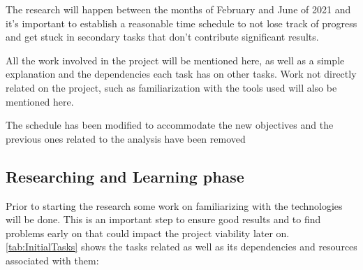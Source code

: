 \label{sec:Tasks}
The research will happen between the months of February and June of 2021 and it's important to establish a reasonable time schedule to not lose track of progress and get stuck in secondary tasks that don't contribute significant results.

All the work involved in the project will be mentioned here, as well as a simple explanation and the dependencies each task has on other tasks. Work not directly related on the project, such as familiarization with the tools used will also be mentioned here.

The schedule has been modified to accommodate the new objectives and the previous ones related to the analysis have been removed


\subsection{Researching and Learning phase}

Prior to starting the research some work on familiarizing with the technologies will be done. This is an important step to ensure good results and to find problems early on that could impact the project viability later on. \autoref{tab:InitialTasks} shows the tasks related as well as its dependencies and resources associated with them:


